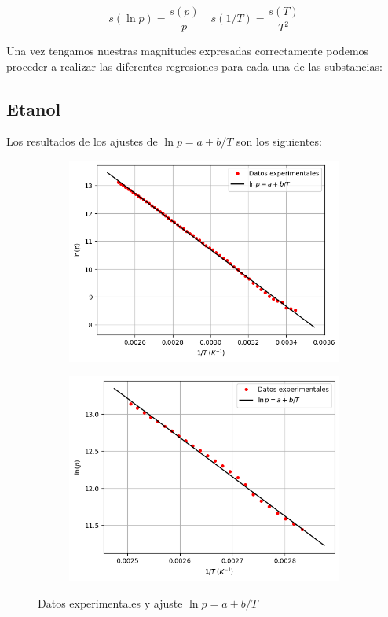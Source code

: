 \documentclass[a4paper,12pt,titlepage]{article}
\begin{document}
\begin{equation}
    s(\ln p) = \frac{s(p)}{p} \quad s(1/T) = \frac{s(T)}{T^2}
\end{equation}

Una vez tengamos nuestras magnitudes expresadas correctamente podemos proceder a realizar las diferentes regresiones para cada una de las substancias:

\subsection{Etanol}

Los resultados de los ajustes de $\ln p = a + b/T$ son los siguientes:

\begin{figure}[h!]
    \centering
    \begin{subfigure}{0.49\textwidth}
        \centering
        \includegraphics[width=1.05\linewidth]{ELV simple/cal_oh.png}
    \end{subfigure}
    \begin{subfigure}{0.49\textwidth}
        \centering
        \includegraphics[width=1.05\linewidth]{ELV simple/enf_oh.png}
    \end{subfigure}
    \caption{Datos experimentales y ajuste $\ln p = a + b/T$}
    \label{fig:enter-label}
\end{figure}
\end{document}
